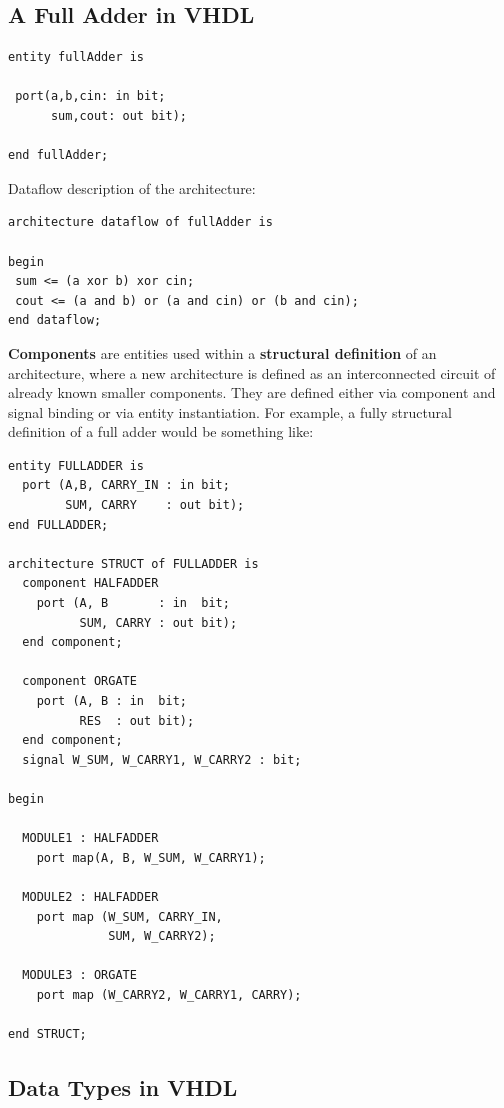 \documentclass{report}
\newcommand{\tbf}{\textbf}
\newcommand*{\newpar}{\par\vspace{\baselineskip}\noindent} %
\begin{document}
\subsection{A Full Adder in VHDL}
\begin{verbatim}
entity fullAdder is

 port(a,b,cin: in bit;
      sum,cout: out bit);

end fullAdder;
\end{verbatim}
Dataflow description of the architecture:
\begin{verbatim}
architecture dataflow of fullAdder is

begin
 sum <= (a xor b) xor cin;
 cout <= (a and b) or (a and cin) or (b and cin);
end dataflow;
\end{verbatim}
\newpar
\tbf{Components} are entities used within a \tbf{structural definition} of an architecture, where a new architecture is defined as an interconnected circuit of already known smaller components. They are defined either via component and signal binding or via entity instantiation. For example, a fully structural definition of a full adder would be something like:
\begin{verbatim}
entity FULLADDER is
  port (A,B, CARRY_IN : in bit;
        SUM, CARRY    : out bit);
end FULLADDER;
 
architecture STRUCT of FULLADDER is
  component HALFADDER
    port (A, B       : in  bit;
          SUM, CARRY : out bit);
  end component;
 
  component ORGATE
    port (A, B : in  bit;
          RES  : out bit);
  end component;
  signal W_SUM, W_CARRY1, W_CARRY2 : bit;
 
begin
 
  MODULE1 : HALFADDER
    port map(A, B, W_SUM, W_CARRY1);
 
  MODULE2 : HALFADDER
    port map (W_SUM, CARRY_IN,
              SUM, W_CARRY2);
 
  MODULE3 : ORGATE
    port map (W_CARRY2, W_CARRY1, CARRY);
 
end STRUCT;
\end{verbatim}
\subsection{Data Types in VHDL}
\end{document}
